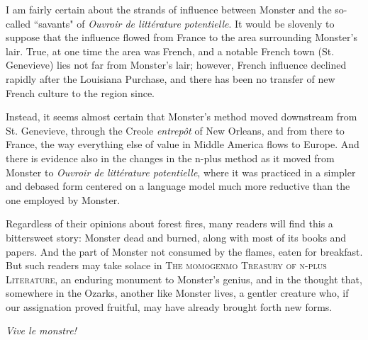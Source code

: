 \par
I am fairly certain about the strands of influence between Monster and the so-called ``savants" of  \textit{Ouvroir de littérature potentielle}.  It would be slovenly to suppose that the influence flowed from France to the area surrounding Monster's lair.  True, at one time the area was French, and a notable French town (St. Genevieve) lies not far from Monster's lair; however, French influence declined rapidly after the Louisiana Purchase, and there has been no transfer of new French culture to the region since.
\par

Instead, it seems almost certain that Monster's method moved downstream from St. Genevieve, through the Creole \textit{entrepôt} of New Orleans, and from there to France, the way everything else of value in Middle America flows to Europe.  And there is evidence also in the changes in the n-plus method as it moved from Monster to \textit{Ouvroir de littérature potentielle}, where it was practiced in a simpler and debased form centered on a language model much more reductive than the one employed by Monster. 
\par
Regardless of their opinions about forest fires, many readers will find this a bittersweet story: Monster dead and burned, along with most of its books and papers.  And the part of Monster not consumed by the flames, eaten for breakfast.  But such readers may take solace in \textsc{The momogenmo Treasury of n-plus Literature}, an enduring monument to Monster's genius, and in the thought that, somewhere in the Ozarks, another like Monster lives, a gentler creature who, if our assignation proved fruitful, may have already brought forth new forms.
\par
\textit{Vive le monstre!}

